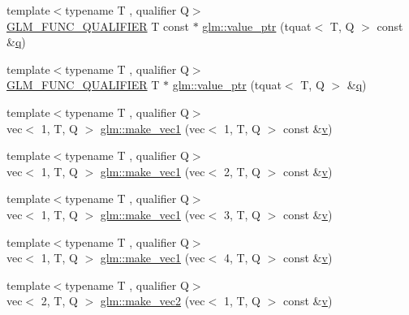 \begin{DoxyCompactItemize}
\item 
{\footnotesize template$<$typename T , qualifier Q$>$ }\\\mbox{\hyperlink{setup_8hpp_a33fdea6f91c5f834105f7415e2a64407}{G\+L\+M\+\_\+\+F\+U\+N\+C\+\_\+\+Q\+U\+A\+L\+I\+F\+I\+ER}} T const  $\ast$ \mbox{\hyperlink{group__gtc__type__ptr_ga8d5728b67f88d8fcce096db3885d74f0}{glm\+::value\+\_\+ptr}} (tquat$<$ T, Q $>$ const \&\mbox{\hyperlink{_s_d_l__opengl_8h_a8fc1e7b9baaae687804c7eed46ca09c6}{q}})
\item 
{\footnotesize template$<$typename T , qualifier Q$>$ }\\\mbox{\hyperlink{setup_8hpp_a33fdea6f91c5f834105f7415e2a64407}{G\+L\+M\+\_\+\+F\+U\+N\+C\+\_\+\+Q\+U\+A\+L\+I\+F\+I\+ER}} T $\ast$ \mbox{\hyperlink{group__gtc__type__ptr_ga38e914875e288a10c99139869be4426a}{glm\+::value\+\_\+ptr}} (tquat$<$ T, Q $>$ \&\mbox{\hyperlink{_s_d_l__opengl_8h_a8fc1e7b9baaae687804c7eed46ca09c6}{q}})
\item 
{\footnotesize template$<$typename T , qualifier Q$>$ }\\vec$<$ 1, T, Q $>$ \mbox{\hyperlink{group__gtc__type__ptr_ga4135f03f3049f0a4eb76545c4967957c}{glm\+::make\+\_\+vec1}} (vec$<$ 1, T, Q $>$ const \&\mbox{\hyperlink{_s_d_l__opengl_8h_a10a82eabcb59d2fcd74acee063775f90}{v}})
\item 
{\footnotesize template$<$typename T , qualifier Q$>$ }\\vec$<$ 1, T, Q $>$ \mbox{\hyperlink{group__gtc__type__ptr_ga13c92b81e55f201b052a6404d57da220}{glm\+::make\+\_\+vec1}} (vec$<$ 2, T, Q $>$ const \&\mbox{\hyperlink{_s_d_l__opengl_8h_a10a82eabcb59d2fcd74acee063775f90}{v}})
\item 
{\footnotesize template$<$typename T , qualifier Q$>$ }\\vec$<$ 1, T, Q $>$ \mbox{\hyperlink{group__gtc__type__ptr_ga3c23cc74086d361e22bbd5e91a334e03}{glm\+::make\+\_\+vec1}} (vec$<$ 3, T, Q $>$ const \&\mbox{\hyperlink{_s_d_l__opengl_8h_a10a82eabcb59d2fcd74acee063775f90}{v}})
\item 
{\footnotesize template$<$typename T , qualifier Q$>$ }\\vec$<$ 1, T, Q $>$ \mbox{\hyperlink{group__gtc__type__ptr_ga6af06bb60d64ca8bcd169e3c93bc2419}{glm\+::make\+\_\+vec1}} (vec$<$ 4, T, Q $>$ const \&\mbox{\hyperlink{_s_d_l__opengl_8h_a10a82eabcb59d2fcd74acee063775f90}{v}})
\item 
{\footnotesize template$<$typename T , qualifier Q$>$ }\\vec$<$ 2, T, Q $>$ \mbox{\hyperlink{group__gtc__type__ptr_ga8476d0e6f1b9b4a6193cc25f59d8a896}{glm\+::make\+\_\+vec2}} (vec$<$ 1, T, Q $>$ const \&\mbox{\hyperlink{_s_d_l__opengl_8h_a10a82eabcb59d2fcd74acee063775f90}{v}})

\end{DoxyCompactItemize}

